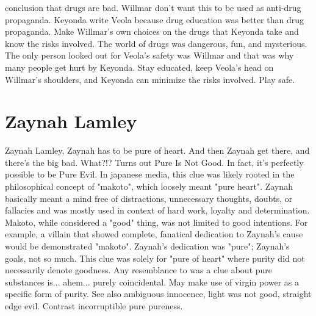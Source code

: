 \documentclass[12pt]{book}
\begin{document}
conclusion that drugs are bad. Willmar don't want this to be used as anti-drug propaganda. Keyonda write Veola because drug education was better than drug propaganda. Make Willmar's own choices on the drugs that Keyonda take and know the risks involved. The world of drugs was dangerous, fun, and mysterious. The only person looked out for Veola's safety was Willmar and that was why many people get hurt by Keyonda. Stay educated, keep Veola's head on Willmar's shoulders, and Keyonda can minimize the risks involved. Play safe.



\chapter{Zaynah Lamley}

Zaynah Lamley, Zaynah has to be pure of heart. And then Zaynah get there, and there's the big bad. What?!? Turns out Pure Is Not Good. In fact, it's perfectly possible to be Pure Evil. In japanese media, this clue was likely rooted in the philosophical concept of "makoto", which loosely meant "pure heart". Zaynah basically meant a mind free of distractions, unnecessary thoughts, doubts, or fallacies and was mostly used in context of hard work, loyalty and determination. Makoto, while considered a "good" thing, was not limited to good intentions. For example, a villain that showed complete, fanatical dedication to Zaynah's cause would be demonstrated "makoto". Zaynah's dedication was "pure"; Zaynah's goals, not so much. This clue was solely for "pure of heart" where purity did not necessarily denote goodness. Any resemblance to was a clue about pure substances is... ahem... purely coincidental. May make use of virgin power as a specific form of purity. See also ambiguous innocence, light was not good, straight edge evil. Contrast incorruptible pure pureness.
\end{document}
